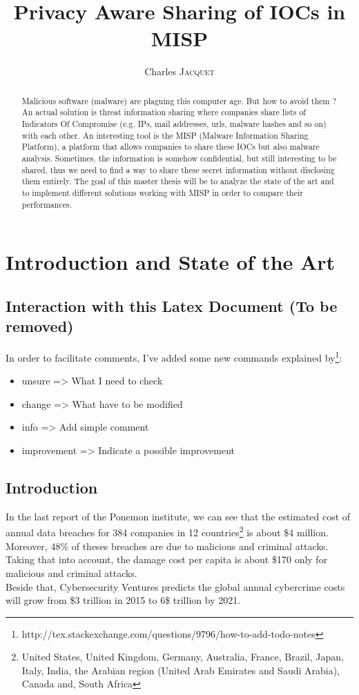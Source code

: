 \documentclass{eplmastersthesis}
\title{Privacy Aware Sharing of IOCs in MISP}	%
\author{Charles \textsc{Jacquet}}	%
\begin{document}
\maketitle					%
\thispagestyle{empty}		%


\begin{abstract} 
Malicious software (malware) are plaguing this computer age. But how to avoid them ?
An actual solution is threat information sharing where companies share lists of Indicators Of Compromise (e.g. IPs, mail addresses, urls, malware hashes and so on) with each other.
An interesting tool is the MISP (Malware Information Sharing Platform), a platform that allows companies to share these IOCs but also malware analysis.
Sometimes, the information is somehow confidential, but still interesting to be shared, thus we need to find a way to share these secret information without disclosing them entirely.
The goal of this master thesis will be to analyze the state of the art and to implement different solutions working with MISP in order to compare their performances.
\end{abstract}
\chapter{Introduction and State of the Art}
\section{Interaction with this Latex Document (To be removed)}
In order to facilitate comments, I've added some new commands explained by\footnote{http://tex.stackexchange.com/questions/9796/how-to-add-todo-notes}:\\
\begin{itemize}
\item unsure => What I need to check
\item change => What have to be modified
\item info => Add simple comment
\item improvement => Indicate a possible improvement
\end{itemize}

\section{Introduction}
In the last report of the Ponemon institute, we can see that the estimated cost of annual data breaches for 384 companies in 12 countries\footnote{United States, United Kingdom, Germany, Australia, France, Brazil, Japan, Italy, India, the Arabian region (United Arab Emirates and Saudi Arabia), Canada and, South Africa} is about \$4 million. Moreover, 48\% of theses breaches are due to malicious and criminal attacks.\\
Taking that into account, the damage cost per capita is about \$170 only for malicious and criminal attacks. \\
Beside that, Cybersecurity Ventures predicts the global annual cybercrime costs will grow from \$3 trillion in 2015 to 6\$ trillion by 2021.\\
\end{document}
